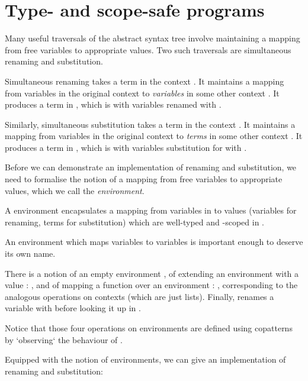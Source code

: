 \documentclass[bsc,frontabs,oneside,singlespacing,parskip,deptreport]{infthesis}
\theoremstyle{definition}
\theoremstyle{lemma}
\begin{document}
\section{Type- and scope-safe programs}
\label{sec:typ-scop-saf-prog}

Many useful traversals of the abstract syntax tree involve maintaining
a mapping from free variables to appropriate values. Two such
traversals are simultaneous renaming and substitution.

Simultaneous renaming takes a term  in the context . It maintains
a mapping  from variables in the original context  to
\textit{variables} in some other context . It produces a term in
, which is  with variables renamed with .

Similarly, simultaneous substitution takes a term  in the context
. It maintains a mapping  from variables in the original context
 to \textit{terms} in some other context . It produces a
term in , which is  with variables substitution for with .

Before we can demonstrate an implementation of renaming and
substitution, we need to formalise the notion of a mapping from free
variables to appropriate values, which we call the
\textit{environment}.


A environment  encapsulates a mapping from variables in
 to values  (variables for renaming, terms for
substitution) which are well-typed and -scoped in .

An environment which maps variables to variables is important enough
to deserve its own name.


There is a notion of an empty environment , of extending an
environment  with a value : , and of mapping a
function  over an environment : ,
corresponding to the analogous operations on contexts (which are just
lists). Finally,  renames a variable with 
before looking it up in .


Notice that those four operations on environments are defined using
copatterns \cite{DBLP:conf/popl/AbelPTS13} by `observing` the
behaviour of .

Equipped with the notion of environments, we can give an
implementation of renaming and substitution:
\end{document}
